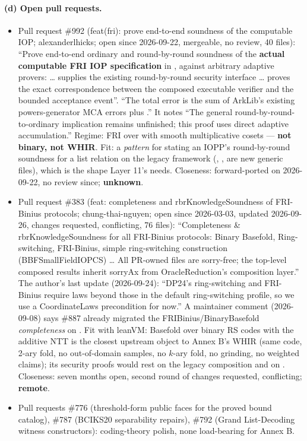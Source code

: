 \paragraph{(d) Open pull requests.}
\begin{itemize}
\item Pull request \#992 (feat(fri): prove end-to-end soundness of the computable IOP;
  alexanderlhicks; open since 2026-09-22, mergeable, no review, 40 files): ``Prove end-to-end
  ordinary and round-by-round soundness of the \textbf{actual computable FRI IOP specification}
  in , against arbitrary adaptive provers: 
  \ldots{}  supplies the existing round-by-round security interface
  \ldots{}  proves the exact correspondence between the composed
  executable verifier and the bounded acceptance event''. ``The total error is the sum of
  ArkLib's existing powers-generator MCA errors plus .''
  It notes ``The general round-by-round-to-ordinary implication remains unfinished; this proof
  uses direct adaptive accumulation.'' Regime: FRI over  with smooth
  multiplicative cosets --- \textbf{not binary, not WHIR}. Fit: a \emph{pattern} for stating an
  IOPP's round-by-round soundness for a list relation on the legacy framework
  (, ,  are new
  generic files), which is the shape Layer 11's  needs. Closeness:
  forward-ported on 2026-09-22, no review since; \textbf{unknown}.
\item Pull request \#383 (feat: completeness and rbrKnowledgeSoundness of FRI-Binius protocols;
  chung-thai-nguyen; open since 2026-03-03, updated 2026-09-26, changes requested, conflicting,
  76 files): ``Completeness \& rbrKnowledgeSoundness for all FRI-Binius protocols: Binary
  Basefold, Ring-switching, FRI-Binius, simple ring-switching construction (BBFSmallFieldIOPCS)
  \ldots{} All PR-owned files are sorry-free; the top-level composed results inherit sorryAx from
  OracleReduction's composition layer.'' The author's last update (2026-09-24): ``DP24's
  ring-switching and FRI-Binius require laws beyond those in the default ring-switching profile,
  so we use a CoordinateLaws precondition for now.'' A maintainer comment (2026-09-08) says \#887
  already migrated the FRIBinius/BinaryBasefold \emph{completeness} on . Fit with
  leanVM: Basefold over binary RS codes with the additive NTT is the closest upstream object to
  Annex B's WHIR (same code, 2-ary fold, no out-of-domain samples, no $k$-ary fold, no grinding,
  no weighted claims); its security proofs would rest on the legacy composition and on
  . Closeness: seven months open, second round of changes
  requested, conflicting; \textbf{remote}.
\item Pull requests \#776 (threshold-form public faces for the proved bound catalog), \#787
  (BCIKS20 separability repairs), \#792 (Grand List-Decoding witness constructors): coding-theory
  polish, none load-bearing for Annex B.
\end{itemize}


